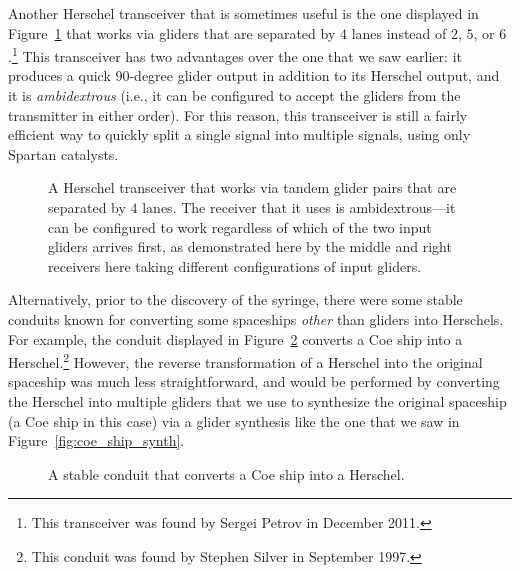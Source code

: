 Another Herschel transceiver that is sometimes useful is the one displayed in Figure~\ref{fig:herschel_transceiver_4} that works via gliders that are separated by $4$ lanes instead of $2$, $5$, or $6$.\footnote{This transceiver was found by Sergei Petrov in December 2011.} This transceiver has two advantages over the one that we saw earlier: it produces a quick 90-degree glider output in addition to its Herschel output, and it is \emph{ambidextrous} (i.e., it can be configured to accept the gliders from the transmitter in either order). For this reason, this transceiver is still a fairly efficient way to quickly split a single signal into multiple signals, using only Spartan catalysts.

\begin{figure}[!htb]
	\centering
	\caption{A Herschel transceiver that works via tandem glider pairs that are separated by $4$ lanes. The receiver that it uses is ambidextrous---it can be configured to work regardless of which of the two input gliders arrives first, as demonstrated here by the middle and right receivers here taking different configurations of input gliders.}
	\label{fig:herschel_transceiver_4}
\end{figure}

Alternatively, prior to the discovery of the syringe, there were some stable conduits known for converting some spaceships \emph{other} than gliders into Herschels. For example, the conduit displayed in Figure~\ref{fig:coe_to_herschel} converts a Coe ship into a Herschel.\footnote{This conduit was found by Stephen Silver in September 1997.} However, the reverse transformation of a Herschel into the original spaceship was much less straightforward, and would be performed by converting the Herschel into multiple gliders that we use to synthesize the original spaceship (a Coe ship in this case) via a glider synthesis like the one that we saw in Figure~\ref{fig:coe_ship_synth}.

\begin{figure}[!htb]
	\centering{}
	\caption{A stable conduit that converts a Coe ship into a Herschel.}\label{fig:coe_to_herschel}
\end{figure}





